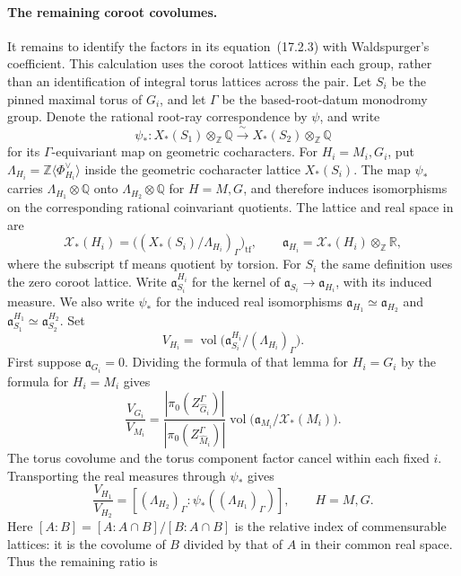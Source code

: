 \paragraph{The remaining coroot covolumes.}
It remains to identify the factors in its equation~(17.2.3) with
Waldspurger's coefficient.  This calculation uses the coroot lattices
within each group, rather than an identification of integral torus
lattices across the pair.  Let $S_i$ be the pinned maximal torus of
$G_i$, and let $\Gamma$ be the based-root-datum monodromy group.
Denote the rational root-ray correspondence by $\psi$, and write
\[
 \psi_*:X_*(S_1)\otimes_{\mathbb Z}\mathbb Q
       \xrightarrow{\ \sim\ }
       X_*(S_2)\otimes_{\mathbb Z}\mathbb Q
\]
for its $\Gamma$-equivariant map on geometric cocharacters.
For $H_i=M_i,G_i$, put
$\Lambda_{H_i}=\mathbb Z\langle\Phi_{H_i}^{\vee}\rangle$ inside the
geometric cocharacter lattice $X_*(S_i)$.
The map $\psi_*$ carries $\Lambda_{H_1}\otimes\mathbb Q$ onto
$\Lambda_{H_2}\otimes\mathbb Q$ for $H=M,G$, and therefore induces
isomorphisms on the corresponding rational coinvariant quotients.
The lattice and real space in
\citet[Lemma~17.10]{HalleckDubeWFLDraft} are
\[
 \mathcal X_*(H_i)=
       \bigl((X_*(S_i)/\Lambda_{H_i})_\Gamma\bigr)_{\mathrm{tf}},
 \qquad
 \mathfrak a_{H_i}=\mathcal X_*(H_i)\otimes_{\mathbb Z}\mathbb R,
\]
where the subscript $\mathrm{tf}$ means quotient by torsion.
For $S_i$ the same definition uses the zero coroot lattice.
Write $\mathfrak a_{S_i}^{H_i}$ for the kernel of
$\mathfrak a_{S_i}\to\mathfrak a_{H_i}$, with its induced measure.
We also write $\psi_*$ for the induced real isomorphisms
$\mathfrak a_{H_1}\simeq\mathfrak a_{H_2}$ and
$\mathfrak a_{S_1}^{H_1}\simeq\mathfrak a_{S_2}^{H_2}$.
Set
\[
 V_{H_i}=\operatorname{vol}\bigl(
  \mathfrak a_{S_i}^{H_i}/(\Lambda_{H_i})_\Gamma
                                  \bigr).
\]
First suppose $\mathfrak a_{G_i}=0$.  Dividing the formula of that
lemma for $H_i=G_i$ by the formula for $H_i=M_i$ gives
\[
 \frac{V_{G_i}}{V_{M_i}}
  =\frac{|\pi_0(Z_{\widehat G_i}^{\Gamma})|}
          {|\pi_0(Z_{\widehat M_i}^{\Gamma})|}
       \operatorname{vol}\bigl(\mathfrak a_{M_i}/\mathcal X_*(M_i)\bigr).
\]
The torus covolume and the torus component factor cancel within each
fixed $i$.  Transporting the real measures through $\psi_*$ gives
\[
 \frac{V_{H_1}}{V_{H_2}}=
 [ (\Lambda_{H_2})_\Gamma:
                  \psi_*((\Lambda_{H_1})_\Gamma)],\qquad H=M,G.
\]
Here $[A:B]=[A:A\cap B]/[B:A\cap B]$ is the relative index of
commensurable lattices: it is the covolume of $B$ divided by that of
$A$ in their common real space.  Thus the remaining ratio is
